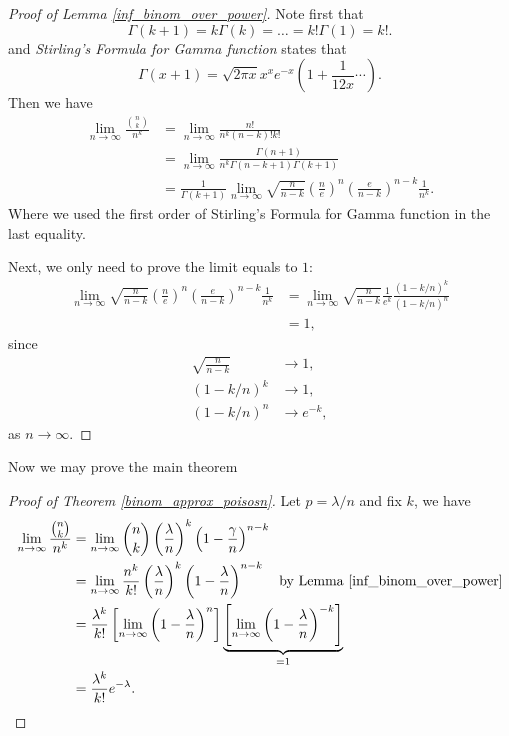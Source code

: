 \documentclass[10pt]{article}
\theoremstyle{remark}
\theoremstyle{plain}
\numberwithin{equation}{section}
\begin{document}
\begin{proof}[Proof of Lemma \ref{inf_binom_over_power}]
	Note first that
		\[
			\Gamma(k+1) = k \Gamma(k) = \dots = k!\Gamma(1) = k!.
		\]
	and \textit{Stirling's Formula for Gamma function} states that
		\[
			\Gamma(x+1) = \sqrt{2\pi x} x^x e^{-x} \left(1 + \frac{1}{12x} \cdots \right).
		\]
	Then we have
	\begin{align*}
		\lim_{n \to \infty} \frac{\binom{n}{k}}{n^k} & = \lim_{n \to \infty} \frac{n!}{n^k (n-k)! k!}
		\\
		& =  \lim_{n \to \infty} \frac{\Gamma(n+1)}{n^k \Gamma(n-k+1) \Gamma(k+1)}
		\\
		& =  \frac{1}{\Gamma(k+1)}\lim_{n \to \infty} \sqrt{\frac{n}{n-k}} \left(\frac{n}{e}\right)^n \left(\frac{e}{n-k}\right)^{n-k} \frac{1}{n^k}.
	\end{align*}
	Where we used the first order of Stirling's Formula for Gamma function in the last equality.
	
	Next, we only need to prove the limit equals to $1$:
	\begin{align*}
		\lim_{n \to \infty} \sqrt{\frac{n}{n-k}} \left(\frac{n}{e}\right)^n \left(\frac{e}{n-k}\right)^{n-k} \frac{1}{n^k} & = \lim_{n \to \infty} \sqrt{\frac{n}{n-k}} \frac{1}{e^k} \frac{(1-k/n)^k}{(1-k/n)^n}
		\\
		& = 1, 
	\end{align*}
	since
	\begin{align*}
		\sqrt{\frac{n}{n-k}} & \to 1,\\
		(1-k/n)^k &\to 1,\\
		(1-k/n)^n &\to e^{-k},
	\end{align*}
	as $n \to \infty$.
\end{proof}
Now we may prove the main theorem
\begin{proof}[Proof of Theorem \ref{binom_approx_poisosn}]
	Let $ p = \lambda/n$ and fix $k$, we have
	\begin{align*}
		\lim_{n \to \infty} \frac{\binom{n}{k}}{n^k} & = \lim_{n \to \infty} \binom{n}{k} \left(\frac{\lambda}{n}\right)^k\left(1 - \frac{\gamma}{n}\right)^{n-k}
		\\
		& = \lim_{n \to \infty} \frac{n^k}{k!} \left(\frac{\lambda}{n}\right)^k \left( 1 - \frac{\lambda}{n} \right)^{n-k} \quad \text{by Lemma \ref{inf_binom_over_power}}
		\\
		& = \frac{\lambda^k}{k!} \left[ \lim_{n \to \infty} \left(1 - \frac{\lambda}{n}\right)^n \right] \underbrace{\left[\lim_{n \to \infty} \left(1 - \frac{\lambda}{n}\right)^{-k} \right]}_{=1}
		\\
		& = \frac{\lambda^k}{k!} e^{-\lambda}.
	\end{align*}
\end{proof}
\end{document}
